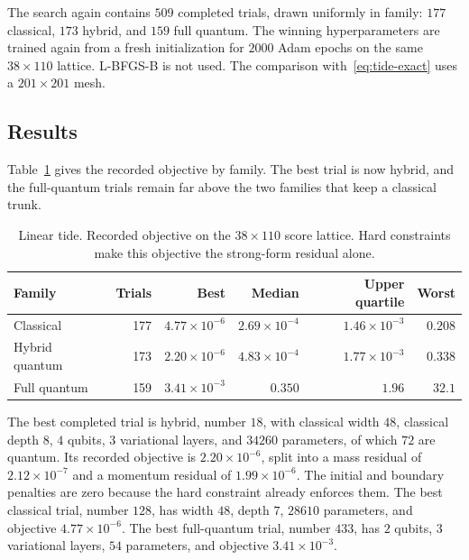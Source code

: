 \documentclass[11pt]{article}
\begin{document}
The search again contains \(509\) completed trials, drawn uniformly in family: \(177\) classical, \(173\) hybrid, and \(159\) full quantum. The winning hyperparameters are trained again from a fresh initialization for \(2000\) Adam epochs on the same \(38\times 110\) lattice. L-BFGS-B is not used. The comparison with~\eqref{eq:tide-exact} uses a \(201\times 201\) mesh.

\subsection{Results}
\label{sec:tidal-results}

Table~\ref{tab:tide-spread} gives the recorded objective by family. The best trial is now hybrid, and the full-quantum trials remain far above the two families that keep a classical trunk.

\begin{table}[ht]
\centering
\caption{Linear tide. Recorded objective on the \(38\times 110\) score lattice. Hard constraints make this objective the strong-form residual alone.}
\label{tab:tide-spread}
\begin{tabular}{lrrrrr}
\toprule
Family & Trials & Best & Median & Upper quartile & Worst \\
\midrule
Classical      & 177 & \(4.77\times 10^{-6}\) & \(2.69\times 10^{-4}\) & \(1.46\times 10^{-3}\) & \(0.208\) \\
Hybrid quantum & 173 & \(2.20\times 10^{-6}\) & \(4.83\times 10^{-4}\) & \(1.77\times 10^{-3}\) & \(0.338\) \\
Full quantum   & 159 & \(3.41\times 10^{-3}\) & \(0.350\)            & \(1.96\)            & \(32.1\) \\
\bottomrule
\end{tabular}
\end{table}

The best completed trial is hybrid, number \(18\), with classical width \(48\), classical depth \(8\), \(4\) qubits, \(3\) variational layers, and \(34260\) parameters, of which \(72\) are quantum. Its recorded objective is \(2.20\times 10^{-6}\), split into a mass residual of \(2.12\times 10^{-7}\) and a momentum residual of \(1.99\times 10^{-6}\). The initial and boundary penalties are zero because the hard constraint already enforces them. The best classical trial, number \(128\), has width \(48\), depth \(7\), \(28610\) parameters, and objective \(4.77\times 10^{-6}\). The best full-quantum trial, number \(433\), has \(2\) qubits, \(3\) variational layers, \(54\) parameters, and objective \(3.41\times 10^{-3}\).
\end{document}
